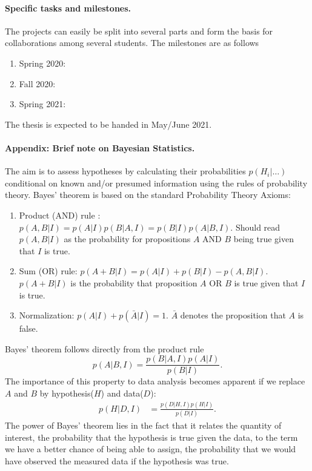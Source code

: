 \documentclass[%
oneside,                 %
final,                   %
10pt]{article}
\begin{document}
\paragraph{Specific tasks and milestones.}
The projects can easily be split into several parts and form the basis for collaborations among several students. The milestones are as follows
\begin{enumerate}
\item Spring 2020: 

\item Fall 2020: 

\item Spring 2021: 
\end{enumerate}

\noindent
The thesis is expected to be handed in May/June  2021.

\paragraph{Appendix: Brief note on Bayesian Statistics.}
The aim is  to assess hypotheses by calculating their probabilities $p(H_i | \ldots)$ conditional on known and/or presumed information using the rules of probability theory.
Bayes' theorem is based on the standard  Probability Theory Axioms:

\begin{enumerate}
\item Product (AND) rule : $p(A, B | I) = p(A|I) p(B|A, I) = p(B|I)p(A|B,I)$. Should read $p(A,B|I)$ as the probability for propositions $A$ AND $B$ being true given that $I$ is true.

\item Sum (OR) rule: $p(A + B | I) = p(A | I) + p(B | I) - p(A, B | I)$. $p(A+B|I)$ is the probability that proposition $A$ OR $B$ is true given that $I$ is true.

\item Normalization: $p(A|I) + p(\bar{A}|I) = 1$. $\bar{A}$ denotes the proposition that $A$ is false.
\end{enumerate}

\noindent
Bayes' theorem follows directly from the product rule
$$
p(A|B,I) = \frac{p(B|A,I) p(A|I)}{p(B|I)}.
$$
The importance of this property to data analysis becomes apparent if we replace $A$ and $B$ by hypothesis($H$) and data($D$):
\begin{align}
p(H|D,I) &= \frac{p(D|H,I) p(H|I)}{p(D|I)}.
\label{eq:bayes}
\end{align}
The power of Bayes’ theorem lies in the fact that it relates the quantity of interest, the probability that the hypothesis is true given the data, to the term we have a better chance of being able to assign, the probability that we would have observed the measured data if the hypothesis was true.
\end{document}
